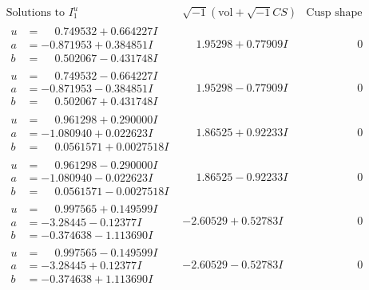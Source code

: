 \documentclass[1p]{elsarticle_modified}
\theoremstyle{definition}
\newcommand{\I}{\sqrt{-1}}
\begin{document}
$$\begin{array}{c|c|c}  
\text{Solutions to }I^u_{1}& \I (\text{vol} + \sqrt{-1}CS) & \text{Cusp shape}\\
 \hline 
\begin{aligned}
u &= \phantom{-}0.749532 + 0.664227 I \\
a &= -0.871953 + 0.384851 I \\
b &= \phantom{-}0.502067 - 0.431748 I\end{aligned}
 & \phantom{-}1.95298 + 0.77909 I & \phantom{-0.000000 } 0 \\ \hline\begin{aligned}
u &= \phantom{-}0.749532 - 0.664227 I \\
a &= -0.871953 - 0.384851 I \\
b &= \phantom{-}0.502067 + 0.431748 I\end{aligned}
 & \phantom{-}1.95298 - 0.77909 I & \phantom{-0.000000 } 0 \\ \hline\begin{aligned}
u &= \phantom{-}0.961298 + 0.290000 I \\
a &= -1.080940 + 0.022623 I \\
b &= \phantom{-}0.0561571 + 0.0027518 I\end{aligned}
 & \phantom{-}1.86525 + 0.92233 I & \phantom{-0.000000 } 0 \\ \hline\begin{aligned}
u &= \phantom{-}0.961298 - 0.290000 I \\
a &= -1.080940 - 0.022623 I \\
b &= \phantom{-}0.0561571 - 0.0027518 I\end{aligned}
 & \phantom{-}1.86525 - 0.92233 I & \phantom{-0.000000 } 0 \\ \hline\begin{aligned}
u &= \phantom{-}0.997565 + 0.149599 I \\
a &= -3.28445 - 0.12377 I \\
b &= -0.374638 - 1.113690 I\end{aligned}
 & -2.60529 + 0.52783 I & \phantom{-0.000000 } 0 \\ \hline\begin{aligned}
u &= \phantom{-}0.997565 - 0.149599 I \\
a &= -3.28445 + 0.12377 I \\
b &= -0.374638 + 1.113690 I\end{aligned}
 & -2.60529 - 0.52783 I & \phantom{-0.000000 } 0 \\ \hline\begin{aligned}

\end{aligned}
\end{array}$$
\end{document}
